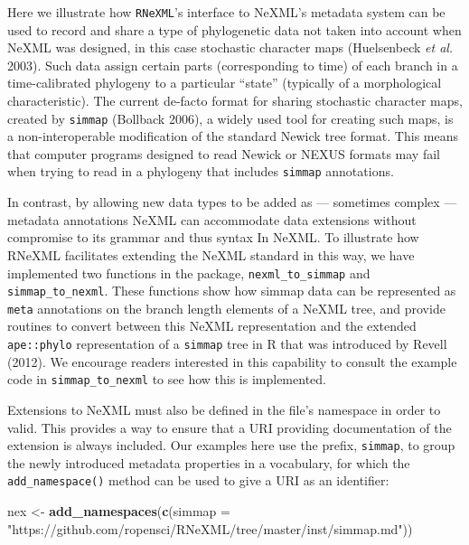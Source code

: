 \documentclass[author-year, review, 11pt]{elsarticle} %
\newenvironment{Shaded}{\begin{snugshade}}{\end{snugshade}}
\newcommand{\KeywordTok}[1]{\textcolor[rgb]{0.13,0.29,0.53}{\textbf{{#1}}}}
\newcommand{\DataTypeTok}[1]{\textcolor[rgb]{0.13,0.29,0.53}{{#1}}}
\newcommand{\StringTok}[1]{\textcolor[rgb]{0.31,0.60,0.02}{{#1}}}
\newcommand{\NormalTok}[1]{{#1}}
\begin{document}
Here we illustrate how \texttt{RNeXML}'s interface to NeXML's metadata
system can be used to record and share a type of phylogenetic data not
taken into account when NeXML was designed, in this case stochastic
character maps (Huelsenbeck \emph{et al.} 2003). Such data assign
certain parts (corresponding to time) of each branch in a
time-calibrated phylogeny to a particular ``state'' (typically of a
morphological characteristic). The current de-facto format for sharing
stochastic character maps, created by \texttt{simmap} (Bollback 2006), a
widely used tool for creating such maps, is a non-interoperable
modification of the standard Newick tree format. This means that
computer programs designed to read Newick or NEXUS formats may fail when
trying to read in a phylogeny that includes \texttt{simmap} annotations.

In contrast, by allowing new data types to be added as --- sometimes
complex --- metadata annotations NeXML can accommodate data extensions
without compromise to its grammar and thus syntax In NeXML. To
illustrate how RNeXML facilitates extending the NeXML standard in this
way, we have implemented two functions in the package,
\texttt{nexml\_to\_simmap} and \texttt{simmap\_to\_nexml}. These
functions show how simmap data can be represented as \texttt{meta}
annotations on the branch length elements of a NeXML tree, and provide
routines to convert between this NeXML representation and the extended
\texttt{ape::phylo} representation of a \texttt{simmap} tree in R that
was introduced by Revell (2012). We encourage readers interested in this
capability to consult the example code in \texttt{simmap\_to\_nexml} to
see how this is implemented.

Extensions to NeXML must also be defined in the file's namespace in
order to valid. This provides a way to ensure that a URI providing
documentation of the extension is always included. Our examples here use
the prefix, \texttt{simmap}, to group the newly introduced metadata
properties in a vocabulary, for which the \texttt{add\_namespace()}
method can be used to give a URI as an identifier:

\begin{Shaded}
\begin{Highlighting}[]
\NormalTok{nex <-}\StringTok{ }\KeywordTok{add_namespaces}\NormalTok{(}\KeywordTok{c}\NormalTok{(}\DataTypeTok{simmap =} 
  \StringTok{"https://github.com/ropensci/RNeXML/tree/master/inst/simmap.md"}\NormalTok{))}
\end{Highlighting}
\end{Shaded}
\end{document}
